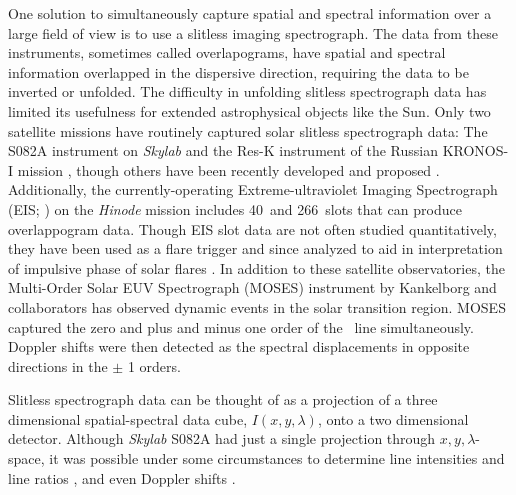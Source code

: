     One solution to simultaneously capture spatial and spectral information over a large field of view is to use a slitless imaging spectrograph.  
    The data from these instruments, sometimes called overlapograms, have spatial and spectral information overlapped in the dispersive direction, requiring the data to be inverted or unfolded.
    The difficulty in unfolding slitless spectrograph data has limited its usefulness for extended astrophysical objects like the Sun. 
    Only two satellite missions have routinely captured solar slitless spectrograph data: The S082A instrument on {\it Skylab} \citep{Tousey1973} and the Res-K instrument of the Russian KRONOS-I mission \citep{Zhitnik1998}, though others have been recently developed and proposed \citep{winebarger2019,golub2020}. 
    Additionally, the currently-operating Extreme-ultraviolet Imaging Spectrograph (EIS; \citet{culhane2007}) on the {\it Hinode} mission \citep{kosugi2007} includes 40\arcsec\ and 266\arcsec\ slots that can produce overlappogram data.
    Though EIS slot data are not often studied quantitatively, they have been used as a flare trigger and since analyzed to aid in interpretation of impulsive phase of solar flares \citep{harra2017,harra2020}.
    In addition to these satellite observatories,  the Multi-Order Solar EUV Spectrograph (MOSES) instrument by Kankelborg and collaborators \citep{Kankelborg01,Fox10,Rust2019} has observed dynamic events in the solar transition region.
    MOSES captured the zero and plus and minus one order of the \heii \ line simultaneously. 
    Doppler shifts were then detected as the spectral displacements in opposite directions in the $\pm$ 1 orders.
    
    Slitless spectrograph data can be thought of as a projection of a three dimensional spatial-spectral data cube, $I(x,y,\lambda)$, onto a two dimensional detector.  
    Although {\it Skylab} S082A had just a single projection through $x,y,\lambda$-space, it was possible under some circumstances to determine line intensities and line ratios \cite[e.g.,][]{Keenan1988, Tayal1989, Keenan2006}, and even Doppler shifts \citep{MariskaDoppler1992}. 

